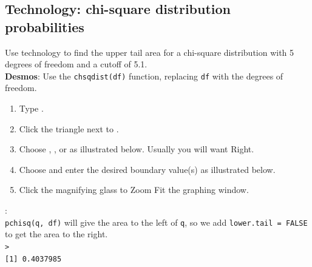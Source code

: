 
\D{\newpage}


\subsection[Technology: chi-square distribution probabilities]{Technology: chi-square distribution probabilities}
\label{techchisqdist}

\noindent Use technology to find the upper tail area for a chi-square distribution with 5 degrees of freedom and a cutoff of 5.1. \\


\noindent \textbf{Desmos}:  Use the \texttt{chsqdist(df)} function, replacing \texttt{df} with the degrees of freedom.
\begin{enumerate}
\setlength{\itemsep}{0mm}
\item Type .
\item Click the triangle next to .
\item Choose , ,  or  as illustrated below.  Usually you will want Right.
\item Choose  and enter the desired boundary value(s) as illustrated below.
\item Click the magnifying glass to Zoom Fit the graphing window.
\begin{center}
\end{center}
\end{enumerate}


\vspace{5mm}
\noindent \R{}:   \\
\texttt{pchisq(q, df)} will give the area to the left of \texttt{q}, so we add \texttt{lower.tail = FALSE} to get the area to the right.\\

\noindent \texttt{> }\\
\texttt{[1] 0.4037985}\\ \\

